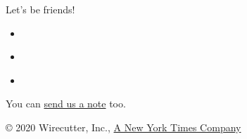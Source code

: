 Let's be friends!

\begin{itemize}
\tightlist
\item
  \href{https://www.facebookcorewwwi.onion/thewirecutter/}{}
\item
  \href{https://www.instagram.com/wirecutter/}{}
\item
  \href{https://twitter.com/wirecutter/}{}
\end{itemize}

You can \href{/wirecutter/contact-us/}{send us a note} too.

© 2020 Wirecutter, Inc., \href{https://nytimes3xbfgragh.onion/}{A New
York Times Company}
